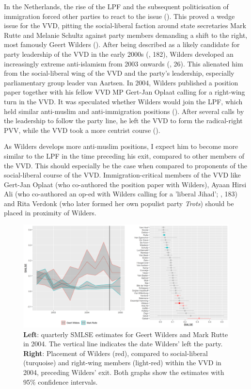 \documentclass{article}
\begin{document}
In the Netherlands, the rise of the LPF and the subsequent politicisation of immigration forced other parties to react to the issue (\cite{DeVries2012c, Pennings2003}). This proved a wedge issue for the VVD, pitting the social-liberal faction around state secretaries Mark Rutte and Melanie Schultz against party members demanding a shift to the right, most famously Geert Wilders (\cite{VandeWardt2014, Vossen2011}). After being described as a likely candidate for party leadership of the VVD in the early 2000s (\cite{Vossen2011}, 182), Wilders developed an increasingly extreme anti-islamism from 2003 onwards (\cite{Vossen2010}, 26). This alienated him from the social-liberal wing of the VVD and the party's leadership, especially parliamentary group leader van Aartsen. In 2004, Wilders published a position paper together with his fellow VVD MP Gert-Jan Oplaat calling for a right-wing turn in the VVD. It was speculated whether Wilders would join the LPF, which held similar anti-muslim and anti-immigration positions (\cite{Parool2004Wilders, Handelsblad2008Wilders}). After several calls by the leadership to follow the party line, he left the VVD to form the radical-right PVV, while the VVD took a more centrist course (\cite{Vossen2010, Vossen2011}). \par

 As Wilders develops more anti-muslim positions, I expect him to become more similar to the LPF in the time preceding his exit, compared to other members of the VVD. This should especially be the case when compared to proponents of the social-liberal course of the VVD. Immigration-critical members of the VVD like Gert-Jan Oplaat (who co-authored the position paper with Wilders), Ayaan Hirsi Ali (who co-authored an op-ed with Wilders calling for a 'liberal Jihad'; \cite{Vossen2011}, 183) and Rita Verdonk (who later formed her own populist party \textit{Trots}) should be placed in proximity of Wilders. \par


\begin{figure}
\includegraphics[width=\linewidth]{NL/vis/Wilders_both.png}
\caption{\textbf{Left}: quarterly SMLSE estimates for Geert Wilders and Mark Rutte in 2004. The vertical line indicates the date Wilders' left the party. \textbf{Right}: Placement of Wilders (red), compared to social-liberal (turquoise) and right-wing members (light-red) within the VVD in 2004, preceding Wilders' exit. Both graphs show the estimates with 95\% confidence intervals.}
\label{fig:wilders}
\end{figure}
\end{document}
